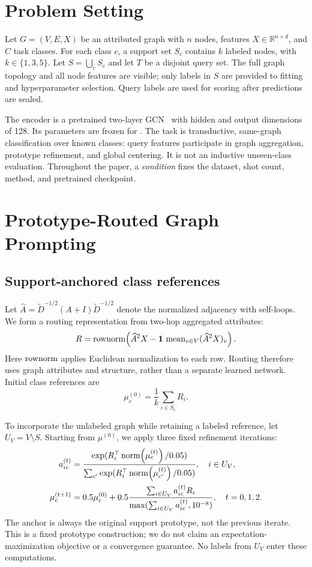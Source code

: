 \section{Problem Setting}
Let $G=(V,E,X)$ be an attributed graph with $n$ nodes, features $X\in\mathbb R^{n\times d}$, and $C$ task classes. For each class $c$, a support set $S_c$ contains $k$ labeled nodes, with $k\in\{1,3,5\}$. Let $S=\bigcup_c S_c$ and let $T$ be a disjoint query set. The full graph topology and all node features are visible; only labels in $S$ are provided to fitting and hyperparameter selection. Query labels are used for scoring after predictions are sealed.

The encoder is a pretrained two-layer GCN~\citep{gcn2017} with hidden and output dimensions of 128. Its parameters are frozen for \method. The task is transductive, same-graph classification over known classes: query features participate in graph aggregation, prototype refinement, and global centering. It is not an inductive unseen-class evaluation. Throughout the paper, a \emph{condition} fixes the dataset, shot count, method, and pretrained checkpoint.

\section{Prototype-Routed Graph Prompting}
\label{sec:method}

\subsection{Support-anchored class references}
Let $\widehat A=\widetilde D^{-1/2}(A+I)\widetilde D^{-1/2}$ denote the normalized adjacency with self-loops. We form a routing representation from two-hop aggregated attributes:
\begin{equation}
R=\operatorname{rownorm}\!\left(\widehat A^2X-\mathbf1\,\operatorname{mean}_{v\in V}(\widehat A^2X)_v\right).
\label{eq:attributes}
\end{equation}
Here $\operatorname{rownorm}$ applies Euclidean normalization to each row. Routing therefore uses graph attributes and structure, rather than a separate learned network. Initial class references are
\begin{equation}
\mu_c^{(0)}=\frac{1}{k}\sum_{i\in S_c}R_i.
\label{eq:anchor}
\end{equation}

To incorporate the unlabeled graph while retaining a labeled reference, let $U_V=V\setminus S$. Starting from $\mu^{(0)}$, we apply three fixed refinement iterations:
\begin{align}
a_{ic}^{(t)}&=\frac{\exp(R_i^\top\operatorname{norm}\!\left(\mu_c^{(t)}\right)/0.05)}{\sum_{c'}\exp(R_i^\top\operatorname{norm}\!\left(\mu_{c'}^{(t)}\right)/0.05)},\quad i\in U_V,\label{eq:assignment}\\
\mu_c^{(t+1)}&=0.5\mu_c^{(0)}+0.5\frac{\sum_{i\in U_V}a_{ic}^{(t)}R_i}{\max(\sum_{i\in U_V}a_{ic}^{(t)},10^{-8})},\quad t=0,1,2.\label{eq:refinement}
\end{align}
The anchor is always the original support prototype, not the previous iterate. This is a fixed prototype construction; we do not claim an expectation-maximization objective or a convergence guarantee. No labels from $U_V$ enter these computations.

